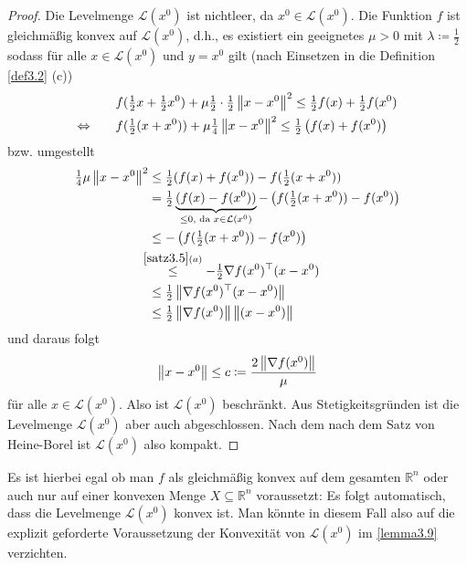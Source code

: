 \begin{proof}
	Die Levelmenge $\mathcal{L}(x^0)$ ist nichtleer, da
	$x^0\in\mathcal{L}(x^0)$.
	Die Funktion $f$ ist gleichmäßig konvex auf $\mathcal{L}(x^0)$,
	d.h., es existiert ein geeignetes $\mu>0$ mit $\lambda\coloneqq\frac{1}{2}$
	sodass für alle $x\in\mathcal{L}(x^0)$ und $y=x^0$ gilt (nach
	Einsetzen in die Definition \ref{def3.2} (c))
	\begin{align*}
	& f(\tfrac{1}{2} x+ \tfrac{1}{2}x^0) + \mu\tfrac{1}{2}\cdot\tfrac{1}{2}\left\lVert x-x^0 \right\rVert^2
	\leq \tfrac{1}{2} f(x) + \tfrac{1}{2}f(x^0)\\
	\Leftrightarrow\qquad
	& f(\tfrac{1}{2} (x+ x^0)) + \mu\tfrac{1}{4}\left\lVert x-x^0 \right\rVert^2
	\leq \tfrac{1}{2}\left( f(x) + f(x^0)\right)
	\end{align*}
	bzw. umgestellt
	\begin{align*}
	\tfrac{1}{4}\mu\left\lVert x-x^0 \right\rVert^2
	&\leq \tfrac{1}{2}( f(x) + f(x^0)) - f(\tfrac{1}{2} (x+ x^0))\\
	&= \tfrac{1}{2}\underbrace{( f(x) - f(x^0))}_{\leq0, \text{ da } x\in\mathcal{L}(x^0)}
	- \left(f(\tfrac{1}{2} (x+ x^0)) - f(x^0)\right)\\
	&\leq - \left(f(\tfrac{1}{2} (x+ x^0)) - f(x^0)\right)\\
	&\!\!\!\!\stackrel{\ref{satz3.5} (a)}{\leq}
	- \tfrac{1}{2}\nabla f(x^0)^\top(x-x^0)\\
	&\leq 
	\tfrac{1}{2}\left\lVert \nabla f(x^0)^\top(x-x^0) \right\rVert\\
	&\leq 
	\tfrac{1}{2}\left\lVert \nabla f(x^0) \right\rVert\left\lVert (x-x^0) \right\rVert
	\end{align*}
	und daraus folgt
	\begin{align*}
	\left\lVert x-x^0 \right\rVert\leq c\coloneqq \frac{2\left\lVert \nabla f(x^0) \right\rVert}{\mu}
	\end{align*}
	für alle $x\in\mathcal{L}(x^0)$. Also ist $\mathcal{L}(x^0)$
	beschränkt. Aus Stetigkeitsgründen ist die Levelmenge
	$\mathcal{L}(x^0)$ aber auch abgeschlossen. Nach dem nach dem Satz
	von Heine-Borel ist $\mathcal{L}(x^0)$ also kompakt.
\end{proof}

Es ist hierbei egal ob man $f$ als gleichmäßig konvex auf dem
gesamten $\mathbb{R}^n$ oder auch nur auf einer konvexen Menge
$X\subseteq\mathbb{R}^n$ voraussetzt: Es folgt automatisch, dass
die Levelmenge $\mathcal{L}(x^0)$ konvex ist. Man könnte in diesem
Fall also auf die explizit geforderte Voraussetzung der Konvexität
von $\mathcal{L}(x^0)$ im \cref{lemma3.9} verzichten.